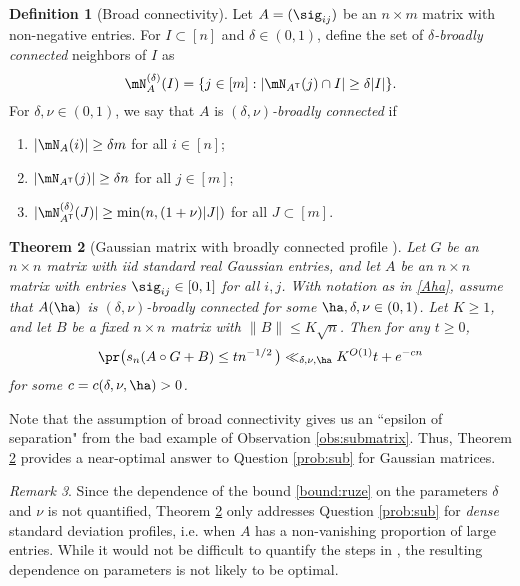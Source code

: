 \documentclass[aop,preprint]{imsart}
\theoremstyle{plain}
\newtheorem{theorem}{Theorem}[section]
\theoremstyle{definition}
\newtheorem{definition}[theorem]{Definition}
\theoremstyle{remark}
\newtheorem{remark}[theorem]{Remark}
\numberwithin{equation}{section}
\numberwithin{theorem}{section}
\def \tran {\mathsf{T}}
\begin{document}
\begin{definition}[Broad connectivity]		\label{def:broad}
Let $A=(\sig_{ij})$ be an $n\times m$ matrix with non-negative entries. 
For $I\subset [n]$ and $\delta\in (0,1)$, define the set of \emph{$\delta$-broadly connected} neighbors of $I$ as
\begin{equation}	\label{def:broadnbr}
\mN_{A}^{(\delta)}(I)= \{ j\in [m]: |\mN_{A^\tran}(j)\cap I|\ge \delta |I|\}.
\end{equation}
For $\delta,\nu\in (0,1)$, we say that $A$ is \emph{$(\delta,\nu)$-broadly connected} if 
\begin{enumerate}[(1)]
\item $|\mN_A(i)| \ge \delta m$ for all $i\in [n]$;\vspace{.2cm}
\item $|\mN_{A^\tran}(j)|\ge \delta n$ for all $j\in [m]$;\vspace{.2cm}
\item $|\mN_{A^\tran}^{(\delta)}(J)| \ge \min(n,(1+\nu)|J|)$ for all $J\subset [m]$.
\end{enumerate}
\end{definition}

\begin{theorem}[Gaussian matrix with broadly connected profile \citep{RuZe}]	\label{thm:ruze}
Let $G$ be an $n\times n$ matrix with iid standard real Gaussian entries, and let $A$ be an $n\times n$ matrix with entries $\sig_{ij}\in [0,1]$ for all $i,j$. 
With notation as in \eqref{Aha}, assume that $A(\ha)$ is $(\delta,\nu)$-broadly connected for some $\ha,\delta,\nu\in (0,1)$.
Let $K\ge1$, and let $B$ be a fixed $n\times n$ matrix with $\|B\|\le K\sqrt{n}$. 
Then for any $t\ge0$,
\begin{equation}	\label{bound:ruze}
\pr\big( s_n(A\circ G+ B) \le tn^{-1/2}\,\big) \ll_{\delta,\nu,\ha} K^{O(1)}t+ e^{-cn}
\end{equation}
for some $c=c(\delta,\nu,\ha)>0$.
\end{theorem}

Note that the assumption of broad connectivity gives us an ``epsilon of separation" from the bad example of Observation \ref{obs:submatrix}.
Thus, Theorem \ref{thm:ruze} provides a near-optimal answer to Question \ref{prob:sub} for Gaussian matrices.

\begin{remark}		\label{rmk:ruze_dense}
Since the dependence of the bound \eqref{bound:ruze} on the parameters $\delta$ and $\nu$ is not quantified, Theorem \ref{thm:ruze} only addresses Question \ref{prob:sub} for \emph{dense} standard deviation profiles, i.e. when $A$ has a non-vanishing proportion of large entries. 
While it would not be difficult to quantify the steps in \citep{RuZe}, the resulting dependence on parameters is not likely to be optimal.
\end{remark}
\end{document}
